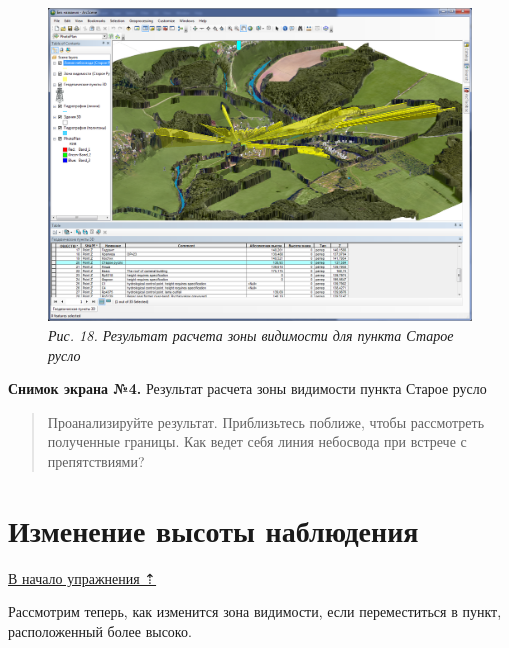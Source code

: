 \documentclass[]{book}
\theoremstyle{definition}
\theoremstyle{definition}
\theoremstyle{definition}
\theoremstyle{remark}
\begin{document}
\begin{enumerate}
  \begin{figure}
  \centering
  \includegraphics{images/Ex18/image20.png}
  \caption{\emph{Рис. 18. Результат расчета зоны видимости для пункта
  Старое русло}}
  \end{figure}

  \textbf{Снимок экрана №4.} Результат расчета зоны видимости пункта
  Старое русло
\end{enumerate}

\begin{quote}
Проанализируйте результат. Приблизьтесь поближе, чтобы рассмотреть
полученные границы. Как ведет себя линия небосвода при встрече с
препятствиями?
\end{quote}

\hypertarget{threed-modelling-height}{%
\section{Изменение высоты наблюдения}\label{threed-modelling-height}}

\protect\hyperlink{threed-modelling}{В начало упражнения ⇡}

Рассмотрим теперь, как изменится зона видимости, если переместиться в
пункт, расположенный более высоко.
\end{document}
